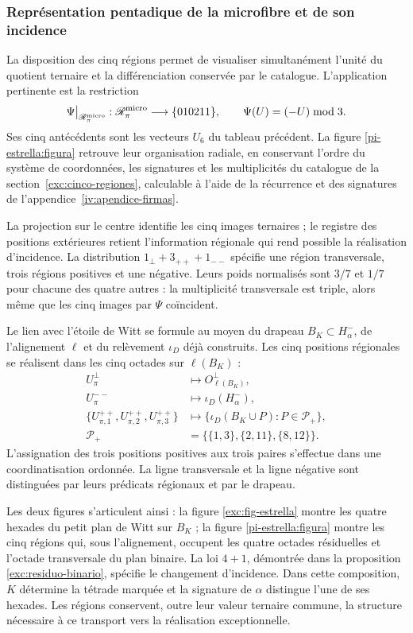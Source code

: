 \subsubsection{Représentation pentadique de la microfibre et de son incidence}
\label{pi-estrella:desarrollo}

La disposition des cinq régions permet de visualiser simultanément
l'unité du quotient ternaire et la différenciation conservée par le
catalogue. L'application pertinente est la restriction
\[
 \Psi\big|_{\mathscr R_\pi^{\rm micro}}:
 \mathscr R_\pi^{\rm micro}\longrightarrow\{010211\},
 \qquad \Psi(U)=(-U)\bmod3.
\]
Ses cinq antécédents sont les vecteurs \(U_6\) du tableau précédent.
La figure \ref{pi-estrella:figura} retrouve leur organisation radiale,
en conservant l’ordre du système de coordonnées, les signatures et les multiplicités du
catalogue de la section~\ref{exc:cinco-regiones}, calculable
à l’aide de la récurrence et des signatures de l’appendice~\ref{iv:apendice-firmas}.



La projection sur le centre identifie les cinq images ternaires ; le
registre des positions extérieures retient l'information régionale
qui rend possible la réalisation d'incidence. La distribution
\(1_\perp+3_{++}+1_{--}\) spécifie une région transversale, trois
régions positives et une négative. Leurs poids normalisés sont
\(3/7\) et \(1/7\) pour chacune des quatre autres : la
multiplicité transversale est triple, alors même que les cinq images par
\(\Psi\) coïncident.

Le lien avec l'étoile de Witt se formule au moyen du drapeau
\(B_K\subset H^-_\alpha\), de l'alignement \(\ell\) et du
relèvement \(\iota_D\) déjà construits. Les cinq positions régionales
se réalisent dans les cinq octades sur \(\ell(B_K)\) :
\[
\begin{aligned}
 U_\pi^\perp&\longmapsto O^\perp_{\ell(B_K)},\\
 U_\pi^{--}&\longmapsto\iota_D(H^-_\alpha),\\
 \{U_{\pi,1}^{++},U_{\pi,2}^{++},U_{\pi,3}^{++}\}
 &\longmapsto
 \{\iota_D(B_K\cup P):P\in\mathcal P_+\},\\
 \mathcal P_+&=\bigl\{\{1,3\},\{2,11\},\{8,12\}\bigr\}.
\end{aligned}
\]
L'assignation des trois positions positives aux trois paires
s'effectue dans une coordinatisation ordonnée. La ligne transversale et la ligne négative
sont distinguées par leurs prédicats régionaux et par le drapeau.

Les deux figures s'articulent ainsi : la figure
\ref{exc:fig-estrella} montre les quatre hexades du petit plan
de Witt sur \(B_K\) ; la figure \ref{pi-estrella:figura} montre
les cinq régions qui, sous l'alignement, occupent les quatre octades
résiduelles et l'octade transversale du plan binaire. La loi
\(4+1\), démontrée dans la proposition
\ref{exc:residuo-binario}, spécifie le changement d'incidence. Dans cette
composition, \(K\) détermine la tétrade marquée et la signature de
\(\alpha\) distingue l'une de ses hexades. Les régions conservent,
outre leur valeur ternaire commune, la structure nécessaire à ce
transport vers la réalisation exceptionnelle.
